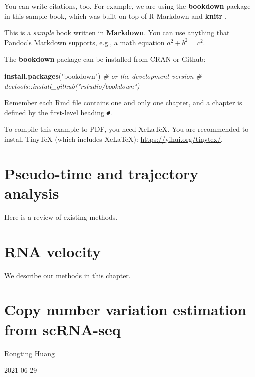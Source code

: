 \documentclass[
]{book}
\newenvironment{Shaded}{\begin{snugshade}}{\end{snugshade}}
\newcommand{\CommentTok}[1]{\textcolor[rgb]{0.56,0.35,0.01}{\textit{#1}}}
\newcommand{\KeywordTok}[1]{\textcolor[rgb]{0.13,0.29,0.53}{\textbf{#1}}}
\newcommand{\NormalTok}[1]{#1}
\newcommand{\StringTok}[1]{\textcolor[rgb]{0.31,0.60,0.02}{#1}}
\begin{document}
You can write citations, too. For example, we are using the \textbf{bookdown} package \citep{R-bookdown} in this sample book, which was built on top of R Markdown and \textbf{knitr} \citep{xie2015}.

This is a \emph{sample} book written in \textbf{Markdown}. You can use anything that Pandoc's Markdown supports, e.g., a math equation \(a^2 + b^2 = c^2\).

The \textbf{bookdown} package can be installed from CRAN or Github:

\begin{Shaded}
\begin{Highlighting}[]
\KeywordTok{install.packages}\NormalTok{(}\StringTok{"bookdown"}\NormalTok{)}
\CommentTok{\# or the development version}
\CommentTok{\# devtools::install\_github("rstudio/bookdown")}
\end{Highlighting}
\end{Shaded}

Remember each Rmd file contains one and only one chapter, and a chapter is defined by the first-level heading \texttt{\#}.

To compile this example to PDF, you need XeLaTeX. You are recommended to install TinyTeX (which includes XeLaTeX): \url{https://yihui.org/tinytex/}.

\hypertarget{pseudo-time-and-trajectory-analysis}{%
\chapter{Pseudo-time and trajectory analysis}\label{pseudo-time-and-trajectory-analysis}}

Here is a review of existing methods.

\hypertarget{rna-velocity}{%
\chapter{RNA velocity}\label{rna-velocity}}

We describe our methods in this chapter.

\hypertarget{copy-number-variation-estimation-from-scrna-seq}{%
\chapter{Copy number variation estimation from scRNA-seq}\label{copy-number-variation-estimation-from-scrna-seq}}

Rongting Huang

2021-06-29
\end{document}
